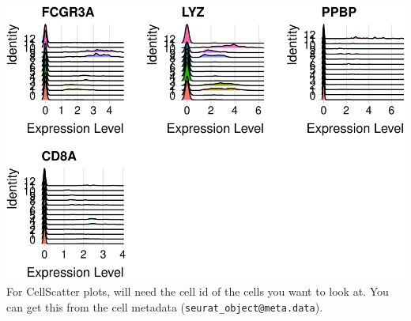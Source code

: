 \documentclass[
]{book}
\begin{document}
\includegraphics{scRNAseqInR_ABACBS_2024_Doco_files/figure-latex/ridgeplots-2.pdf}
For CellScatter plots, will need the cell id of the cells you want to look at. You can get this from the cell metadata (\texttt{seurat\_object@meta.data}).
\end{document}

